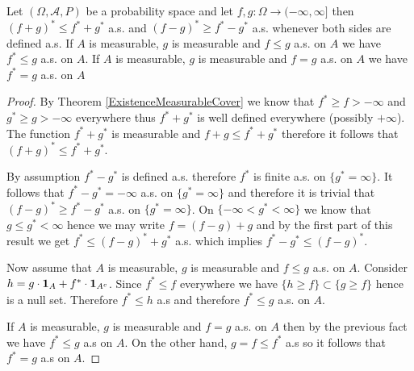 \begin{prop}\label{BasicPropertiesOfMeasurableCover} Let $(\Omega, \mathcal{A}, P)$  be a probability space and let $f,g : \Omega \to (-\infty, \infty]$ then $(f+g)^* \leq f^* + g^*$ a.s. and
$(f - g)^* \geq f^* - g^*$ a.s. whenever both sides are defined a.s.  If $A$ is measurable, $g$ is measurable and $f \leq g$ a.s. on $A$ we have $f^* \leq g$ a.s. on $A$.  If $A$ is measurable, $g$ is measurable and $f = g$ a.s. on $A$ we have $f^* = g$ a.s. on $A$
\end{prop}
\begin{proof}
By Theorem \ref{ExistenceMeasurableCover} we know that $f^* \geq f > -\infty$ and $g^* \geq g > -\infty$ everywhere thus $f^* + g^*$ is well defined everywhere (possibly $+\infty$).  The function
$f^* + g^*$ is measurable and $f+g \leq f^* + g^*$ therefore it follows that $(f+g)^* \leq f^* + g^*$.

By assumption $f^* - g^*$ is defined a.s. therefore $f^*$ is finite a.s. on $\lbrace g^* = \infty \rbrace$.  It follows that $f^* - g^* = -\infty$ a.s. on $\lbrace g^* = \infty \rbrace$ and therefore it is trivial that $(f-g)^* \geq f^* - g^*$ a.s. on $\lbrace g^* = \infty \rbrace$.  On $\lbrace -\infty < g^* < \infty \rbrace$ we know that $g \leq g^* < \infty$ hence we may write $f = (f - g) + g$ and by the first part of this result we get $f^* \leq (f -g)^*+ g^*$ a.s. which implies $f^* - g^* \leq (f - g)^*$.

Now assume that $A$ is measurable, $g$ is measurable and $f \leq g$ a.s. on $A$.  Consider $h = g \cdot \textbf{1}_{A} + f^* \cdot \textbf{1}_{A^c}$.  Since $f^* \leq f$ everywhere we have
$\lbrace h \geq f \rbrace \subset \lbrace g  \geq f \rbrace$ hence is a null set.  Therefore $f^* \leq h$ a.s and therefore $f^* \leq g$ a.s. on $A$.

If $A$ is measurable, $g$ is measurable and $f = g$ a.s. on $A$ then by the previous fact we have $f^* \leq g$ a.s on $A$.  On the other hand, $g = f \leq f^*$ a.s so it follows that $f^* = g$ a.s on $A$.
\end{proof}


